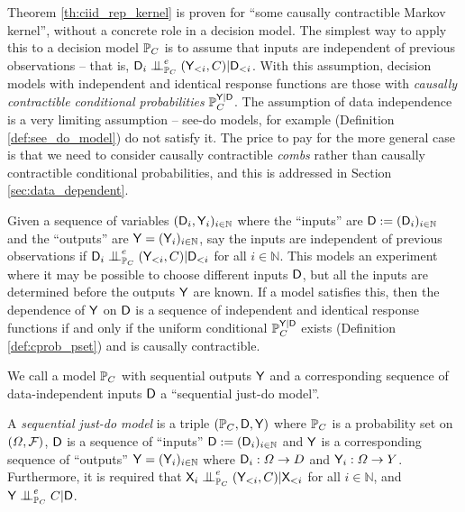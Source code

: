 Theorem \ref{th:ciid_rep_kernel} is proven for ``some causally contractible Markov kernel'', without a concrete role in a decision model. The simplest way to apply this to a decision model $\mathbb{P}_C$ is to assume that inputs are independent of previous observations -- that is, $\RV{D}_i\CI^e_{\prob{P}_C} (\RV{Y}_{<i},C)|\RV{D}_{<i}$. With this assumption, decision models with independent and identical response functions are those with \emph{causally contractible conditional probabilities} $\mathbb{P}_C^{\mathsf{Y}|\mathsf{D}}$. The assumption of data independence is a very limiting assumption -- see-do models, for example (Definition \ref{def:see_do_model}) do not satisfy it. The price to pay for the more general case is that we need to consider causally contractible \emph{combs} rather than causally contractible conditional probabilities, and this is addressed in Section \ref{sec:data_dependent}.

Given a sequence of variables $(\mathsf{D}_i,\mathsf{Y}_i)_{i\in \mathbb{N}}$ where the ``inputs'' are $\mathsf{D}:=(\mathsf{D}_i)_{i\in\mathbb{N}}$ and the ``outputs'' are $\mathsf{Y}=(\mathsf{Y}_i)_{i\in\mathbb{N}}$, say the inputs are independent of previous observations if $\RV{D}_i\CI^e_{\prob{P}_C} (\RV{Y}_{<i},C)|\RV{D}_{<i}$ for all $i\in\mathbb{N}$. This models an experiment where it may be possible to choose different inputs $\mathsf{D}$, but all the inputs are determined before the outputs $\mathsf{Y}$ are known. If a model satisfies this, then the dependence of $\mathsf{Y}$ on $\mathsf{D}$ is a sequence of independent and identical response functions if and only if the uniform conditional $\mathbb{P}_C^{\mathsf{Y}|\mathsf{D}}$ exists (Definition \ref{def:cprob_pset}) and is causally contractible.

We call a model $\mathbb{P}_C$ with sequential outputs $\mathsf{Y}$ and a corresponding sequence of data-independent inputs $\mathsf{D}$ a ``sequential just-do model''.

\begin{definition}
A \emph{sequential just-do model} is a triple $(\mathbb{P}_C,\mathsf{D},\mathsf{Y})$ where $\mathbb{P}_C$ is a probability set on $(\Omega,\mathcal{F})$, $\mathsf{D}$ is a sequence of ``inputs'' $\mathsf{D}:=(\mathsf{D}_i)_{i\in\mathbb{N}}$ and $\mathsf{Y}$ is a corresponding sequence of ``outputs'' $\mathsf{Y}=(\mathsf{Y}_i)_{i\in\mathbb{N}}$ where $\mathsf{D}_i:\Omega\to D$ and $\mathsf{Y}_i:\Omega\to Y$. Furthermore, it is required that $\RV{X}_i\CI^e_{\prob{P}_C} (\RV{Y}_{<i},C)|\RV{X}_{<i}$ for all $i\in \mathbb{N}$, and $\RV{Y}\CI^e_{\prob{P}_C} C|\RV{D}$.
\end{definition}

